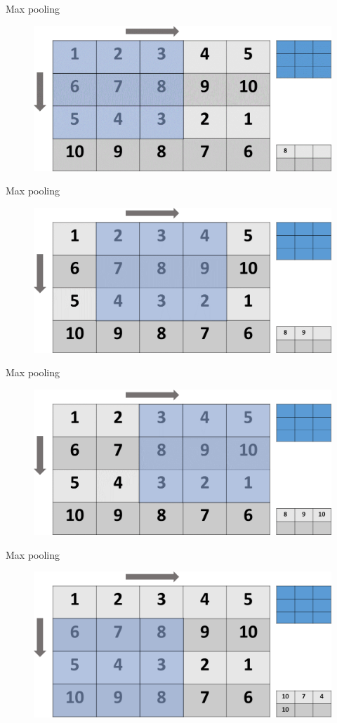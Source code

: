 \begin{frame}{Max pooling}
	\begin{figure}
			\includegraphics[width=.7\textwidth, center]{figures/maxpool2}
	\end{figure}
\end{frame}
\begin{frame}{Max pooling}
	\begin{figure}
		\includegraphics[width=.7\textwidth, center]{figures/maxpool3}
	\end{figure}
\end{frame}
\begin{frame}{Max pooling}
	\begin{figure}
		\includegraphics[width=.7\textwidth, center]{figures/maxpool4}
	\end{figure}
\end{frame}
\begin{frame}{Max pooling}
	\begin{figure}
		\includegraphics[width=.7\textwidth, center]{figures/maxpool5}
	\end{figure}
\end{frame}
